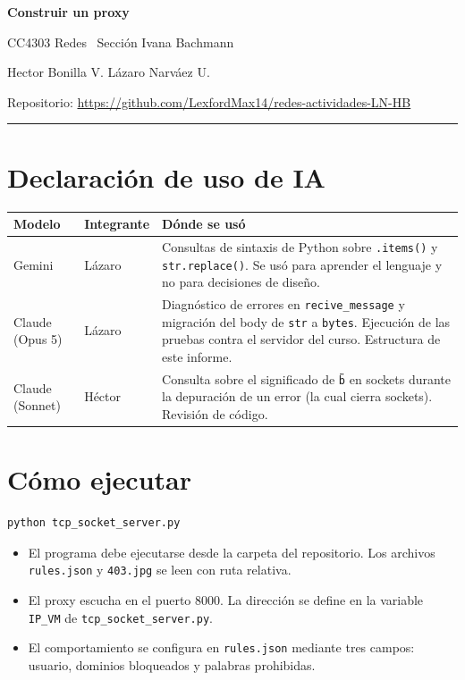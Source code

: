 \documentclass[11pt,a4paper]{article}
\newcommand{\cabtabla}[1]{\rowcolor{filahead}\textbf{#1}}
\begin{document}
\begin{center}
{\color{acento}\LARGE\bfseries Construir un proxy\par}
\vspace{4pt}
{\large\color{gris} CC4303 Redes \textperiodcentered\ Sección Ivana Bachmann\par}
\vspace{8pt}
{Hector Bonilla V. \quad\textbullet\quad Lázaro Narváez U.\par}
\vspace{4pt}
{\small Repositorio: \url{https://github.com/LexfordMax14/redes-actividades-LN-HB}\par}
\end{center}

\vspace{6pt}
{\color{acento!30}\rule{\textwidth}{1pt}}

\section{Declaración de uso de IA}

\begin{tabularx}{\textwidth}{@{}l l X@{}}
\toprule
\cabtabla{Modelo} & \cabtabla{Integrante} & \cabtabla{Dónde se usó} \\
\midrule
Gemini & Lázaro & Consultas de sintaxis de Python sobre \texttt{.items()} y \texttt{str.replace()}.
Se usó para aprender el lenguaje y no para decisiones de diseño. \\
\addlinespace
Claude (Opus 5) & Lázaro & Diagnóstico de errores en \texttt{recive\_message} y migración del body
de \texttt{str} a \texttt{bytes}. Ejecución de las pruebas contra el servidor del curso.
Estructura de este informe. \\
\addlinespace
Claude (Sonnet) & Héctor & Consulta sobre el significado de \texttt{b\"\"} en sockets durante la
depuración de un error (la cual cierra sockets). Revisión de código. \\
\bottomrule
\end{tabularx}

\section{Cómo ejecutar}

\begin{lstlisting}
python tcp_socket_server.py
\end{lstlisting}

\begin{itemize}
  \item El programa debe ejecutarse desde la carpeta del repositorio. Los archivos
        \texttt{rules.json} y \texttt{403.jpg} se leen con ruta relativa.
  \item El proxy escucha en el puerto 8000. La dirección se define en la variable \texttt{IP\_VM}
        de \texttt{tcp\_socket\_server.py}.
  \item El comportamiento se configura en \texttt{rules.json} mediante tres campos: usuario,
        dominios bloqueados y palabras prohibidas.
\end{itemize}
\end{document}
